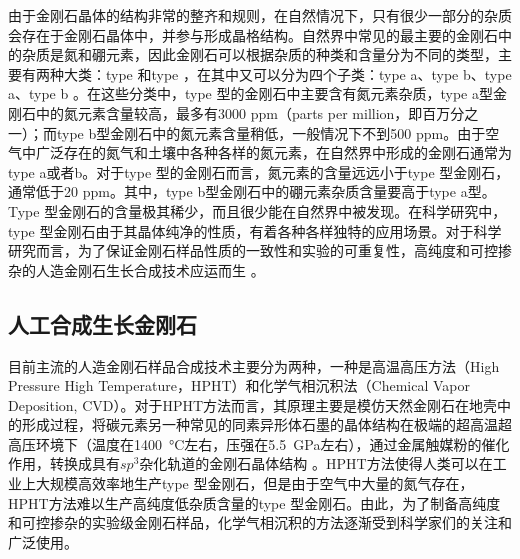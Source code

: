 \documentclass[type = bachelor, oneside]{whu-thesis}
\begin{document}
由于金刚石晶体的结构非常的整齐和规则，在自然情况下，只有很少一部分的杂质会存在于金刚石晶体中，并参与形成晶格结构。自然界中常见的最主要的金刚石中的杂质是氮和硼元素，因此金刚石可以根据杂质的种类和含量分为不同的类型，主要有两种大类：type \uppercase\expandafter{}和type \uppercase\expandafter{}，在其中又可以分为四个子类：type \uppercase\expandafter{}a、type \uppercase\expandafter{}b、type \uppercase\expandafter{}a、type \uppercase\expandafter{}b \cite{Breeding2009}。在这些分类中，type \uppercase\expandafter{}型的金刚石中主要含有氮元素杂质，type \uppercase\expandafter{}a型金刚石中的氮元素含量较高，最多有3000 ppm（parts per million，即百万分之一）；而type \uppercase\expandafter{}b型金刚石中的氮元素含量稍低，一般情况下不到500 ppm。由于空气中广泛存在的氮气和土壤中各种各样的氮元素，在自然界中形成的金刚石通常为type \uppercase\expandafter{}a或者\uppercase\expandafter{}b。对于type \uppercase\expandafter{}型的金刚石而言，氮元素的含量远远小于type \uppercase\expandafter{}型金刚石，通常低于20 ppm。其中，type \uppercase\expandafter{}b型金刚石中的硼元素杂质含量要高于type \uppercase\expandafter{}a型。Type \uppercase\expandafter{}型金刚石的含量极其稀少，而且很少能在自然界中被发现。在科学研究中，type \uppercase\expandafter{}型金刚石由于其晶体纯净的性质，有着各种各样独特的应用场景。对于科学研究而言，为了保证金刚石样品性质的一致性和实验的可重复性，高纯度和可控掺杂的人造金刚石生长合成技术应运而生 \cite{Sumiya1997, Spitsyn1981, Gracio2010}。

\subsection{人工合成生长金刚石}
目前主流的人造金刚石样品合成技术主要分为两种，一种是高温高压方法（High Pressure High Temperature，HPHT）和化学气相沉积法（Chemical Vapor Deposition, CVD）。对于HPHT方法而言，其原理主要是模仿天然金刚石在地壳中的形成过程，将碳元素另一种常见的同素异形体石墨的晶体结构在极端的超高温超高压环境下（温度在\SI{1400}{\degreeCelsius}左右，压强在\SI{5.5}{\GPa}左右），通过金属触媒粉的催化作用，转换成具有$sp^3$杂化轨道的金刚石晶体结构 \cite{Dossa2023}。HPHT方法使得人类可以在工业上大规模高效率地生产type \uppercase\expandafter{}型金刚石，但是由于空气中大量的氮气存在，HPHT方法难以生产高纯度低杂质含量的type \uppercase\expandafter{}型金刚石。由此，为了制备高纯度和可控掺杂的实验级金刚石样品，化学气相沉积的方法逐渐受到科学家们的关注和广泛使用。
\end{document}
